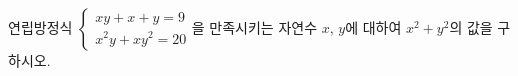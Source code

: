 연립방정식 $\begin{cases} xy+x+y=9 \\ x^2y+xy^2=20 \end{cases}$을 만족시키는 자연수 $x$, $y$에 대하여 $x^2+y^2$의 값을 구하시오.
